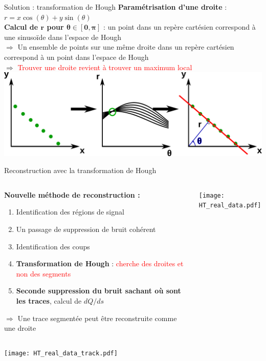     \begin{frame}{Solution : transformation de Hough}
        \textbf{Paramétrisation d'une droite }: $r=x\cos(\theta)+y\sin(\theta)$\\
        \textbf{Calcul de $\boldsymbol{r}$ pour $\boldsymbol{\theta\in[0,\pi]}$} : un point dans un repère cartésien correspond à une sinusoïde dans l'espace de Hough\\
        $\Rightarrow$ Un ensemble de points sur une même droite dans un repère cartésien correspond à un point dans l'espace de Hough\\
        $\Rightarrow$ \textcolor{red}{Trouver une droite revient à trouver un maximum local}\\\vfill
        \includegraphics[width=\textwidth]{./pictures/HT.pdf}
    \end{frame}

    \begin{frame}{Reconstruction avec la transformation de Hough}
        \begin{scriptsize}
            \begin{columns}
                \begin{column}{0.5\textwidth}
                    \textbf{Nouvelle méthode de reconstruction :}
                    \begin{enumerate}
                        \item Identification des régions de signal
                        \item Un passage de suppression de bruit cohérent
                        \item Identification des coups
                        \item \textbf{Transformation de Hough} : \textcolor{red}{cherche des droites et non des segments}
                        \item \textbf{Seconde suppression du bruit sachant où sont les traces}, calcul de $dQ/ds$
                    \end{enumerate}
                    $\Rightarrow$ Une trace segmentée peut être reconstruite comme une droite
                \end{column}
                \begin{column}{0.5\textwidth}
                    \centering \texttt{[image: HT\_real\_data.pdf]}
                \end{column}
            \end{columns}
            \begin{center} \texttt{[image: HT\_real\_data\_track.pdf]} \end{center}
        \end{scriptsize}
    \end{frame}

